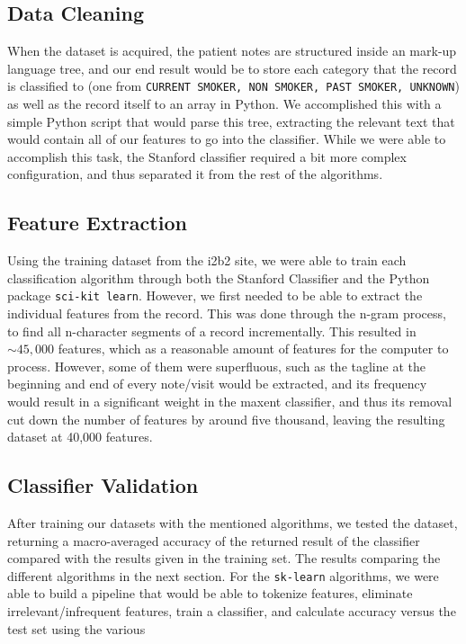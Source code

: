 \documentclass[12pt]{article}
\begin{document}
\subsection{Data Cleaning}
When the dataset is acquired, the patient notes are structured inside an mark-up language tree, and our end result would be to store each category that the record is classified to (one from \texttt{CURRENT SMOKER, NON SMOKER, PAST SMOKER, UNKNOWN}) as well as the record itself to an array in Python. We accomplished this with a simple Python script that would parse this tree, extracting the relevant text that would contain all of our features to go into the classifier. While we were able to accomplish this task, the Stanford classifier required a bit more complex configuration, and thus separated it from the rest of the algorithms.
\subsection{Feature Extraction}
Using the training dataset from the i2b2 site, we were able to train each classification algorithm through both the Stanford Classifier and the Python package \texttt{sci-kit learn}. However, we first needed to be able to extract the individual features from the record. This was done through the n-gram process, to find all n-character segments of a record incrementally. This resulted in $\sim 45,000$ features, which as a reasonable amount of features for the computer to process. However, some of them were superfluous, such as the tagline at the beginning and end of every note/visit would be extracted, and its frequency would result in a significant weight in the maxent classifier, and thus its removal cut down the number of features by around five thousand, leaving the resulting dataset at 40,000 features.
\subsection{Classifier Validation}
After training our datasets with the mentioned algorithms, we tested the dataset, returning a macro-averaged accuracy of the returned result of the classifier compared with the results given in the training set. The results comparing the different algorithms in the next section. For the \texttt{sk-learn} algorithms, we were able to build a pipeline that would be able to tokenize features, eliminate irrelevant/infrequent features, train a classifier, and calculate accuracy versus the test set using the various
\end{document}
